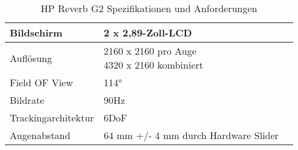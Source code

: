 \begin{table}[h]
    \renewcommand*{\arraystretch}{2}
    \setlength{\tabcolsep}{1.5cm}
    \begin{tabular}{lll}
        \hspace{-1.5cm}Bildschirm          & 2 x 2,89-Zoll-LCD                    \\ \hline
        \hspace{-1.5cm}Auflösung           & \makecell[l]{2160 x 2160 pro Auge    \\4320 x 2160 kombiniert}  \\ \hline
        \hspace{-1.5cm}Field OF View       & \raisebox{-0.6ex}{\~{ }}114°         \\ \hline
        \hspace{-1.5cm}Bildrate            & 90Hz                                 \\ \hline
        \hspace{-1.5cm}Trackingarchitektur & 6DoF                                 \\ \hline
        \hspace{-1.5cm}Augenabstand        & 64 mm +/- 4 mm durch Hardware Slider \\ \hline
    \end{tabular}
    \caption[Tabelle 1]{HP Reverb G2 Spezifikationen und Anforderungen \parencite{HPG2}}
\end{table}








